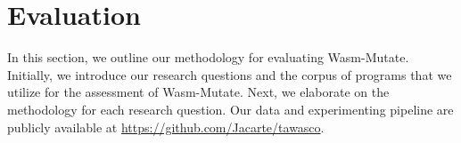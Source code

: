 \documentclass[sigplan,screen]{acmart}
\newcommand*\badge[1]{ \colorbox{red}{\color{white}#1}}
\newcommand{\tool}{{\sc Wasm-Mutate}\xspace}
\newcommand{\Wasm}{WebAssembly\xspace}
\newcommand{\dataurl}{\url{https://github.com/Jacarte/tawasco}}
\newcommand{\todo}[1]{%
\refstepcounter{todo}
\noindent\textbf{\badge{TODO}} {\color{red}#1}
\addcontentsline{td}{todo}
{\color{red}\thesection.\thetodo\xspace #1}}
\begin{document}
%




\vspace{-2mm}
\section {Evaluation}
\label{eval}

In this section, we outline our methodology for evaluating \tool.
Initially, we introduce our research questions and the corpus of programs that we utilize for the assessment of \tool.
Next, we elaborate on the methodology for each research question.
Our data and experimenting pipeline are publicly available at \dataurl.


\newcommand\rqstatic{To what extent are the program variants generated by \tool statically different from the original programs?\xspace}

\newcommand\rqdynamic{How fast can \tool generate variants of the original programs that offer different execution traces?\xspace}

\newcommand\rqdefensive{To what extent does \tool prevent side-channel attacks on \Wasm programs?\xspace}


\newcommand\rqperformance{To what extent does \tool affects the performance of \Wasm program variants?\xspace}


\newcommand\rqtesting{To what extent can \tool be used to perform differential testing of \Wasm tools?\xspace}

\newcommand{\nProgramsRosetta}{303\xspace}


\newcommand{\DTWStatic}{\ensuremath{\mathit{dt\_static}\xspace}}
\newcommand{\DTWDynamic}{\ensuremath{\mathit{dt\_dy}\xspace}}
\end{document}
